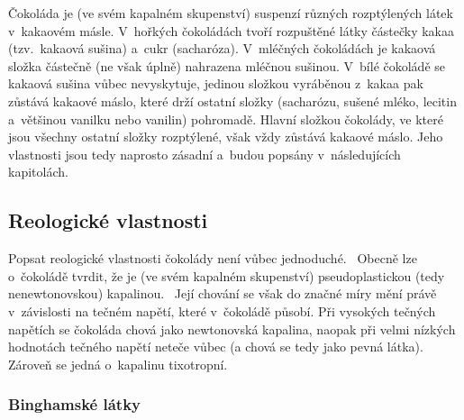 \documentclass[12pt]{article}
\begin{document}
Čokoláda je (ve svém kapalném skupenství) suspenzí různých rozptýlených látek v~kakaovém másle. V~hořkých čokoládách tvoří rozpuštěné látky částečky kakaa (tzv.~kakaová sušina) a~cukr (sacharóza). V~mléčných čokoládách je kakaová složka částečně (ne však úplně) nahrazena mléčnou sušinou. V~bílé čokoládě se kakaová sušina vůbec nevyskytuje, jedinou složkou vyráběnou z~kakaa pak zůstává kakaové máslo, které drží ostatní složky (sacharózu, sušené mléko, lecitin a~většinou vanilku nebo vanilin) pohromadě. Hlavní složkou čokolády, ve které jsou všechny ostatní složky rozptýlené, však vždy zůstává kakaové máslo. Jeho vlastnosti jsou tedy naprosto zásadní a~budou popsány v~následujících kapitolách.~\cite{Article:chocolate_composition}\cite{Article:Determination_of_chocolate_viscosity}\cite{wiki:Chocolate}\cite{wiki:čokoláda}\cite{wiki:Bílá_čokoláda}

\subsection{Reologické vlastnosti}%
\label{sec:Reologické_vlastnosti_čokolády}%

Popsat reologické vlastnosti čokolády není vůbec jednoduché.~\cite{Article:Determination_of_chocolate_viscosity} Obecně lze o~čokoládě tvrdit, že je (ve svém kapalném skupenství) pseudoplastickou (tedy nenewtonovskou) kapalinou.~\cite{Article:Comparison_of_models_chocolate}\cite{Article:Rapid_and_economic_chocolate_viscosity} Její chování se však do značné míry mění právě v~závislosti na tečném napětí, které v~čokoládě působí. Při vysokých tečných napětích se čokoláda chová jako newtonovská kapalina, naopak při velmi nízkých hodnotách tečného napětí neteče vůbec (a chová se tedy jako pevná látka). Zároveň se jedná o~kapalinu tixotropní.~\cite{Article:Determination_of_chocolate_viscosity}

\subsubsection{Binghamské látky}%
\end{document}
